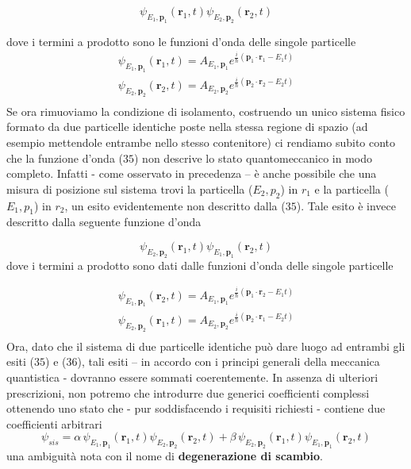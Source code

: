 \begin{equation}
    \psi_{E_{1},\mathbf{p}_{1}}(\mathbf{r}_{1},t) \psi_{E_{2},\mathbf{p}_{2}}(\mathbf{r}_{2},t)
\end{equation}

dove i termini a prodotto sono le funzioni d'onda delle singole
particelle \begin{gather*}
    \psi_{E_{1},\mathbf{p}_{1}}(\mathbf{r}_{1},t) = A_{E_{1},\mathbf{p}_{1}}e^{ \frac{i}{\hbar} (\mathbf{p}_{1} \cdot \mathbf{r}_{1}-E_{1}t)}\\
    \psi_{E_{2},\mathbf{p}_{2}}(\mathbf{r}_{2},t) = A_{E_{2},\mathbf{p}_{2}}e^{ \frac{i}{\hbar} (\mathbf{p}_{2} \cdot \mathbf{r}_{2}-E_{2}t)}\\
\end{gather*} Se ora rimuoviamo la condizione di isolamento, costruendo un unico
sistema fisico formato da due particelle identiche poste nella stessa
regione di spazio (ad esempio mettendole entrambe nello stesso
contenitore) ci rendiamo subito conto che la funzione d'onda (\(35\))
non descrive lo stato quantomeccanico in modo completo.
Infatti - come
osservato in precedenza -- è anche possibile che una misura di posizione
sul sistema trovi la particella (\(E_{2},p_{2}\)) in \(r_{1}\) e la
particella (\(E_{1},p_{1}\)) in \(r_{2}\), un esito evidentemente non
descritto dalla (\(35\)).
Tale esito è invece descritto dalla seguente
funzione d'onda

\begin{equation}
    \psi_{E_{2},\mathbf{p}_{2}}(\mathbf{r}_{1},t) \psi_{E_{1},\mathbf{p}_{1}}(\mathbf{r}_{2},t)
\end{equation} dove i termini a prodotto sono dati dalle funzioni d'onda
delle singole particelle

\begin{gather*}
    \psi_{E_{1},\mathbf{p}_{1}}(\mathbf{r}_{2},t) = A_{E_{1},\mathbf{p}_{1}}e^{ \frac{i}{\hbar} (\mathbf{p}_{1} \cdot \mathbf{r}_{2}-E_{1}t)}\\
    \psi_{E_{2},\mathbf{p}_{2}}(\mathbf{r}_{1},t) = A_{E_{2},\mathbf{p}_{2}}e^{ \frac{i}{\hbar} (\mathbf{p}_{2} \cdot \mathbf{r}_{1}-E_{2}t)}\\
\end{gather*} Ora, dato che il sistema di due particelle identiche può dare luogo
ad entrambi gli esiti (\(35\)) e (\(36\)), tali esiti -- in accordo con
i principi generali della meccanica quantistica - dovranno essere
sommati coerentemente.
In assenza di ulteriori prescrizioni, non potremo
che introdurre due generici coefficienti complessi ottenendo uno stato
che - pur soddisfacendo i requisiti richiesti - contiene due
coefficienti arbitrari \[
                           \psi_{sis} = \alpha \, \psi_{E_{1},\mathbf{p}_{1}}(\mathbf{r}_{1},t) \psi_{E_{2},\mathbf{p}_{2}}(\mathbf{r}_{2},t) +
                           \beta \, \psi_{E_{2},\mathbf{p}_{2}}(\mathbf{r}_{1},t) \psi_{E_{1},\mathbf{p}_{1}}(\mathbf{r}_{2},t)
\] una ambiguità nota con il nome di \textbf{degenerazione di scambio}.